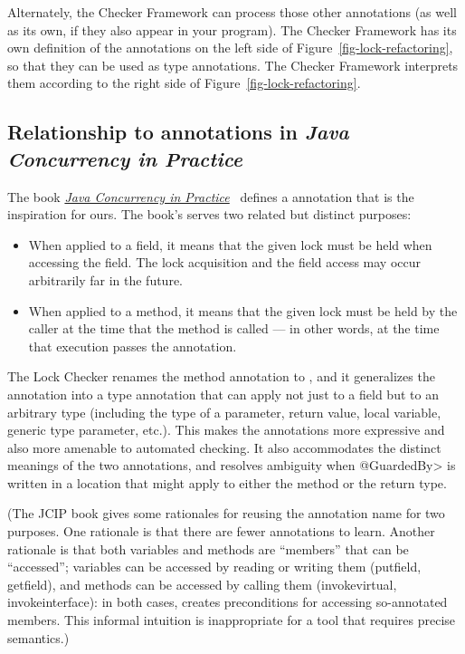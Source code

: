 Alternately, the Checker Framework can process those other annotations (as
well as its own, if they also appear in your program).  The Checker
Framework has its own definition of the annotations on the left side of
Figure~\ref{fig-lock-refactoring}, so that they can be used as type
annotations.  The Checker Framework interprets them according to the right
side of Figure~\ref{fig-lock-refactoring}.


\subsection{Relationship to annotations in \emph{Java Concurrency in Practice}\label{lock-jcip-annotations}}

The book \href{http://jcip.net/}{\emph{Java Concurrency in Practice}}~\cite{Goetz2006} defines a
\href{http://jcip.net.s3-website-us-east-1.amazonaws.com/annotations/doc/net/jcip/annotations/GuardedBy.html}{} annotation that is the inspiration for ours.  The book's
 serves two related but distinct purposes:

\begin{itemize}
\item
  When applied to a field, it means that the given lock must be held when
  accessing the field.  The lock acquisition and the field access may occur
  arbitrarily far in the future.
\item
  When applied to a method, it means that the given lock must be held by
  the caller at the time that the method is called --- in other words, at
  the time that execution passes the  annotation.
\end{itemize}

The Lock Checker renames the method annotation to
, and it generalizes the
 annotation into a type annotation
that can apply not just to a field but to an arbitrary type (including the
type of a parameter, return value, local variable, generic type parameter,
etc.).  This makes the annotations more expressive and also more amenable
to automated checking.  It also accommodates the distinct
meanings of the two annotations, and resolves ambiguity when \<@GuardedBy>
is written in a location that might apply to either the method or the
return type.

(The JCIP book gives some rationales for reusing the annotation name for
two purposes.  One rationale is
that there are fewer annotations to learn.  Another rationale is
that both variables and methods are ``members'' that can be ``accessed'';
variables can be accessed by reading or writing them (putfield, getfield),
and methods can be accessed by calling them (invokevirtual,
invokeinterface):  in both cases,  creates preconditions
for accessing so-annotated members.  This informal intuition is
inappropriate for a tool that requires precise semantics.)

